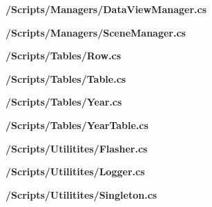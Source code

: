 \begin{landscape}
\textbf{/Scripts/Managers/DataViewManager.cs}


\textbf{/Scripts/Managers/SceneManager.cs}


\textbf{/Scripts/Tables/Row.cs}


\textbf{/Scripts/Tables/Table.cs}


\textbf{/Scripts/Tables/Year.cs}


\textbf{/Scripts/Tables/YearTable.cs}


\textbf{/Scripts/Utilitites/Flasher.cs}


\textbf{/Scripts/Utilitites/Logger.cs}


\textbf{/Scripts/Utilitites/Singleton.cs}




\end{landscape}